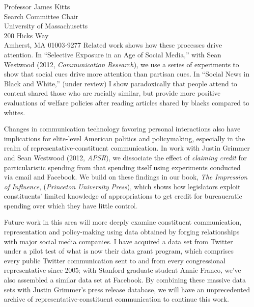 \documentclass[fontsize=12pt, paper=a4]{scrlttr2}
\begin{document}
\begin{letter}{Professor James Kitts\\
Search Committee Chair\\
University of Massachusetts\\
200 Hicks Way\\
Amherst, MA 01003-9277}
Related work shows how these processes drive attention. In ``Selective Exposure in an Age of Social Media,'' with Sean Westwood (2012, \emph{Communication Research}), we use a series of experiments to show that social cues drive more attention than partisan cues.  %
In ``Social News in Black and White,'' (under review) I show paradoxically that people attend to content shared those who are racially similar, but provide more positive evaluations of welfare policies after reading articles shared by blacks compared to whites.  

Changes in communication technology favoring personal interactions also have implications for elite-level American politics and policymaking, especially in the realm of representative-constituent communication.  In work with Justin Grimmer and Sean Westwood (2012, \emph{APSR}), we dissociate the effect of \emph{claiming credit} for particularistic spending from that spending itself using  experiments conducted via email and Facebook.  %
We build on these findings in our book, \emph{The Impression of Influence}, (\emph{Princeton University Press}), which shows how legislators exploit constituents' limited knowledge of appropriations to get credit for bureaucratic spending over which they have little control.  

Future work in this area will more deeply examine constituent communication, representation and policy-making using data obtained by forging relationships with major social media companies.  I have acquired a data set from Twitter under a pilot test of what is now their data grant program, which comprises every public Twitter communication sent to and from every congressional representative since 2005; with Stanford graduate student Annie Franco, we've also assembled a similar data set at Facebook.  By combining these massive data sets with Justin Grimmer's press release database, we will have an unprecedented archive of representative-constituent communication to continue this work.


\end{letter}
\end{document}
